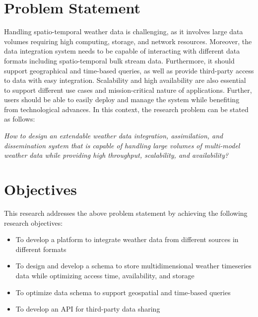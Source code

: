 \section{Problem Statement}
Handling spatio-temporal weather data is challenging, as it involves large data volumes requiring high computing, storage, and network resources. Moreover, the data integration system needs to be capable of interacting with different data formats including spatio-temporal bulk stream data. Furthermore, it should support geographical and time-based queries, as well as provide third-party access to data with easy integration. Scalability and high availability are also essential to support different use cases and mission-critical nature of applications.
Further, users should be able to easily deploy and manage the system while benefiting from technological advances. 
In this context, the research problem can be stated as follows:

\emph{How to design an extendable weather data integration, assimilation, and dissemination system that is capable of handling large volumes of multi-model weather data while providing high throughput, scalability, and availability?}

\section{Objectives}
This research addresses the above problem statement by achieving the following research objectives:
\begin{itemize}
    \item To develop a platform to integrate weather data from different sources in different formats
    \item To design and develop a schema to store multidimensional weather timeseries data while optimizing access time, availability, and storage
    \item To optimize data schema to support geospatial and time-based queries
    \item To develop an API for third-party data sharing
\end{itemize}
